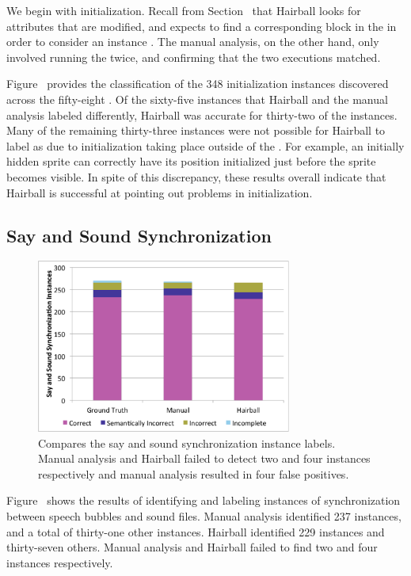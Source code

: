 We begin with initialization. Recall from Section~ that
Hairball looks for attributes that are modified, and expects to find a
corresponding \abs{} block in the \initzone{} in order to consider an instance
\correct{}. The manual analysis, on the other hand, only involved running the
\sprogram{} twice, and confirming that the two executions matched.

Figure~ provides the classification of the 348
initialization instances discovered across the fifty-eight . Of the
sixty-five instances that Hairball and the manual analysis labeled differently,
Hairball was accurate for thirty-two of the instances. Many of the remaining
thirty-three instances were not possible for Hairball to label as \correct{}
due to initialization taking place outside of the \initzone{}. For example, an
initially hidden sprite can correctly have its position initialized just before
the sprite becomes visible. In spite of this discrepancy, these results overall
indicate that Hairball is successful at pointing out problems in
initialization.

\subsection{Say and Sound Synchronization}
\begin{figure}[!t]
\centering
\includegraphics[trim=.3in .15in .3in .15in, clip,
  width=3.3in]{graphs/AutoSaySoundSync.eps}
\caption{Compares the say and sound synchronization instance labels. Manual
  analysis and Hairball failed to detect two and four instances respectively
  and manual analysis resulted in four false positives.}
\end{figure}


Figure~ shows the results of identifying and
labeling instances of synchronization between speech bubbles and sound
files. Manual analysis identified 237 \correct{} instances, and a total of
thirty-one other instances. Hairball identified 229 \correct{} instances and
thirty-seven others. Manual analysis and Hairball failed to find two and four
instances respectively.


